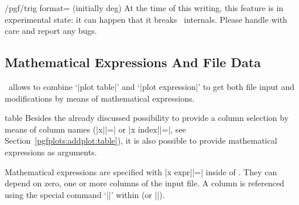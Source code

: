 {\begin{key}{/pgf/trig format= (initially deg)}
	At the time of this writing, this feature is in experimental state: it can happen that it breaks \tikzname\ internals. Please handle with care and report any bugs.
	
\begin{codeexample}[]
\end{codeexample}
\end{key}

\subsection{Mathematical Expressions And File Data}
\PGFPlots\ allows to combine `|plot table|' and `|plot expression|' to get both file input and modifications by means of mathematical expressions.

\begin{addplotoperation}[]{table}{}
\label{pgfplots:addplot:table:expr}
	Besides the already discussed possibility to provide a column selection by means of column names (|x||=| or |x index||=|, see Section~\ref{pgfplots:addplot:table}), it is also possible to provide mathematical expressions as arguments.

	Mathematical expressions are specified with |x expr||=| inside of . They can depend on zero, one or more columns of the input file. A column is referenced using the special command `|\thisrow|' within  (or |\thisrowno|).

\begin{codeexample}[vbox]

\end{codeexample}


\end{addplotoperation}}

